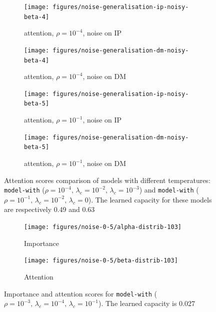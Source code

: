 \begin{figure}[!h]
\centering
\begin{subfigure}{.5\textwidth}
  \centering
  \texttt{[image: figures/noise-generalisation-ip-noisy-beta-4]}
  \caption{attention, $\rho=10^{-4}$, noise on IP} 
  \label{fig:exp-att-shift-3-a}
\end{subfigure}%
\begin{subfigure}{.5\textwidth}
  \centering
  \texttt{[image: figures/noise-generalisation-dm-noisy-beta-4]}
  \caption{attention, $\rho=10^{-4}$, noise on DM} 
\end{subfigure}
\begin{subfigure}{.5\textwidth}
  \centering
  \texttt{[image: figures/noise-generalisation-ip-noisy-beta-5]}
  \caption{attention, $\rho=10^{-1}$, noise on IP} 
  \label{fig:exp-att-shift-3-c}
\end{subfigure}%
\begin{subfigure}{.5\textwidth}
  \centering
  \texttt{[image: figures/noise-generalisation-dm-noisy-beta-5]}
  \caption{attention, $\rho=10^{-1}$, noise on DM} 
\end{subfigure}
\caption{Attention scores comparison of models with different temperatures: \texttt{model-with} ($\rho=10^{-4},\,\lambda_e=10^{-2},\,\lambda_c=10^{-3}$) and \texttt{model-with} ($\rho=10^{-1},\,\lambda_e=10^{-2},\,\lambda_c=0$). The learned capacity for these models are respectively 0.49 and 0.63}
\label{fig:exp-att-shift-3}
\end{figure}

\begin{figure}[!h]
\centering
\begin{subfigure}{.5\textwidth}
  \centering
  \texttt{[image: figures/noise-0-5/alpha-distrib-103]}
  \caption{Importance} 
\end{subfigure}%
\begin{subfigure}{.5\textwidth}
  \centering
  \texttt{[image: figures/noise-0-5/beta-distrib-103]}
  \caption{Attention} 
\end{subfigure}
\caption{Importance and attention scores for \texttt{model-with} ($\rho=10^{-3},\,\lambda_e=10^{-4},\,\lambda_c=10^{-1}$). The learned capacity is 0.027}
\label{fig:exp-att-shift-4}
\end{figure}

